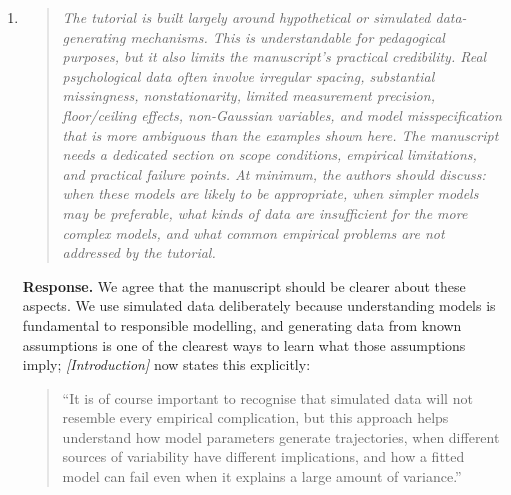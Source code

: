 \documentclass[11pt]{article}
\newcommand{\response}{\textbf{Response.} }
\newcommand{\secit}[1]{\textit{[#1]}}
\newcommand{\msq}[1]{\begin{quote}\small\noindent``#1''\end{quote}}
\newenvironment{reviewerpoint}{\begin{quote}\itshape}{\end{quote}}
\begin{document}
\begin{enumerate}[label=\textbf{Reviewer 2, Main Concern \arabic*.}]
\begin{reviewerpoint}
The paper's generalizability is limited by its heavy reliance on a single didactic example.
The running example of couples' affect dynamics is pedagogically effective, but the manuscript remains too tightly tied to this particular scenario.
As a result, the paper sometimes feels less like a broad methodological tutorial and more like a long, well-developed demonstration within one narrow substantive context.
\end{reviewerpoint}

\response We retained the running example because it allows the tutorial to show how model complexity develops cumulatively from simple to complex specifications, but have made explanations and examples more general throughout, and included alternative examples from different domains whenever new concepts are introduced, to address the concern.
\item

\begin{reviewerpoint}
The tutorial is built largely around hypothetical or simulated data-generating mechanisms.
This is understandable for pedagogical purposes, but it also limits the manuscript's practical credibility.
Real psychological data often involve irregular spacing, substantial missingness, nonstationarity, limited measurement precision, floor/ceiling effects, non-Gaussian variables, and model misspecification that is more ambiguous than the examples shown here.
The manuscript needs a dedicated section on scope conditions, empirical limitations, and practical failure points.
At minimum, the authors should discuss: when these models are likely to be appropriate, when simpler models may be preferable, what kinds of data are insufficient for the more complex models, and what common empirical problems are not addressed by the tutorial.
\end{reviewerpoint}

\response We agree that the manuscript should be clearer about these aspects.
We use simulated data deliberately because understanding models is fundamental to responsible modelling, and generating data from known assumptions is one of the clearest ways to learn what those assumptions imply; \secit{Introduction} now states this explicitly:
\msq{It is of course important to recognise that simulated data will not resemble every empirical complication, but this approach helps understand how model parameters generate trajectories, when different sources of variability have different implications, and how a fitted model can fail even when it explains a large amount of variance.}


\end{enumerate}
\end{document}
